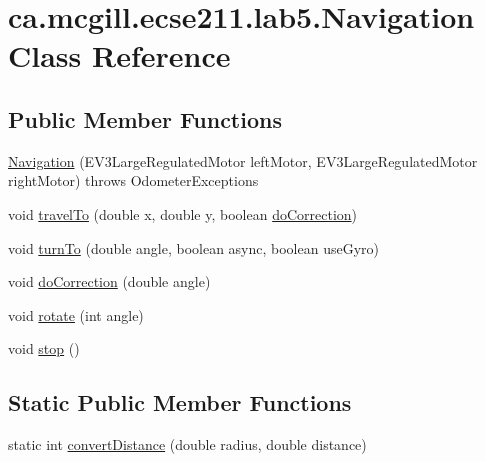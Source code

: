 \hypertarget{classca_1_1mcgill_1_1ecse211_1_1lab5_1_1_navigation}{}\section{ca.\+mcgill.\+ecse211.\+lab5.\+Navigation Class Reference}
\label{classca_1_1mcgill_1_1ecse211_1_1lab5_1_1_navigation}
\subsection*{Public Member Functions}
\begin{DoxyCompactItemize}
\item 
\hyperlink{classca_1_1mcgill_1_1ecse211_1_1lab5_1_1_navigation_a93b746f61226c3b14532c43d0c2f61dd}{Navigation} (E\+V3\+Large\+Regulated\+Motor left\+Motor, E\+V3\+Large\+Regulated\+Motor right\+Motor)  throws Odometer\+Exceptions 
\item 
void \hyperlink{classca_1_1mcgill_1_1ecse211_1_1lab5_1_1_navigation_a318969f4776d0bf4a8721be3d2444a5c}{travel\+To} (double x, double y, boolean \hyperlink{classca_1_1mcgill_1_1ecse211_1_1lab5_1_1_navigation_a73a89ddd822e0ba1cfd7a29c18aa7aea}{do\+Correction})
\item 
void \hyperlink{classca_1_1mcgill_1_1ecse211_1_1lab5_1_1_navigation_ac2c358ea3663ac06fcf757628a4a4a31}{turn\+To} (double angle, boolean async, boolean use\+Gyro)
\item 
void \hyperlink{classca_1_1mcgill_1_1ecse211_1_1lab5_1_1_navigation_a73a89ddd822e0ba1cfd7a29c18aa7aea}{do\+Correction} (double angle)
\item 
void \hyperlink{classca_1_1mcgill_1_1ecse211_1_1lab5_1_1_navigation_a5fcce0063a6b557d349a6fb5bf144c64}{rotate} (int angle)
\item 
void \hyperlink{classca_1_1mcgill_1_1ecse211_1_1lab5_1_1_navigation_afe038af6692e7ad28c3587cd979d7223}{stop} ()
\end{DoxyCompactItemize}
\subsection*{Static Public Member Functions}
\begin{DoxyCompactItemize}
\item 
static int \hyperlink{classca_1_1mcgill_1_1ecse211_1_1lab5_1_1_navigation_a85122ad723d0988c118866f367073be6}{convert\+Distance} (double radius, double distance)
\end{DoxyCompactItemize}


